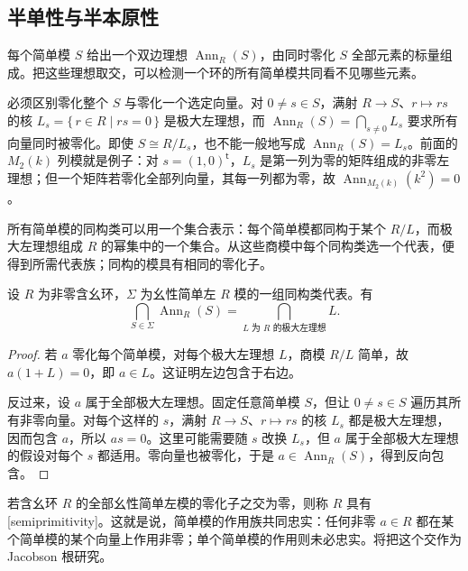 \subsection{半单性与半本原性}
\label{b2:subsec:1302:03}

每个简单模 \(S\) 给出一个双边理想 \(\operatorname{Ann}_R(S)\)，由同时零化 \(S\) 全部元素的标量组成。把这些理想取交，可以检测一个环的所有简单模共同看不见哪些元素。

\ProseParagraphBreak
必须区别零化整个 \(S\) 与零化一个选定向量。对 \(0\ne s\in S\)，满射 \(R\to S\)、\(r\mapsto rs\) 的核 \(L_s=\{\,r\in R\mid rs=0\,\}\) 是极大左理想，而 \(\operatorname{Ann}_R(S)=\bigcap_{s\ne0}L_s\) 要求所有向量同时被零化。即使 \(S\cong R/L_s\)，也不能一般地写成 \(\operatorname{Ann}_R(S)=L_s\)。前面的 \(M_2(k)\) 列模就是例子：对 \(s=(1,0)^{\mathsf t}\)，\(L_s\) 是第一列为零的矩阵组成的非零左理想；但一个矩阵若零化全部列向量，其每一列都为零，故 \(\operatorname{Ann}_{M_2(k)}(k^2)=0\)。

\ProseParagraphBreak
所有简单模的同构类可以用一个集合表示：每个简单模都同构于某个 \(R/L\)，而极大左理想组成 \(R\) 的幂集中的一个集合。从这些商模中每个同构类选一个代表，便得到所需代表族；同构的模具有相同的零化子。

\begin{proposition}\label{b2:prop:simple-annihilator-intersection}
	设 \(R\) 为非零含幺环，\(\Sigma\) 为幺性简单左 \(R\) 模的一组同构类代表。有
	\[
		\bigcap_{S\in\Sigma}\operatorname{Ann}_R(S) =\bigcap_{L\text{ 为 }R\text{ 的极大左理想}}L.
	\]
\end{proposition}
\begin{proof}
	若 \(a\) 零化每个简单模，对每个极大左理想 \(L\)，商模 \(R/L\) 简单，故 \(a(1+L)=0\)，即 \(a\in L\)。这证明左边包含于右边。

	反过来，设 \(a\) 属于全部极大左理想。固定任意简单模 \(S\)，但让 \(0\ne s\in S\) 遍历其所有非零向量。对每个这样的 \(s\)，满射 \(R\to S\)、\(r\mapsto rs\) 的核 \(L_s\) 都是极大左理想，因而包含 \(a\)，所以 \(as=0\)。这里可能需要随 \(s\) 改换 \(L_s\)，但 \(a\) 属于全部极大左理想的假设对每个 \(s\) 都适用。零向量也被零化，于是 \(a\in\operatorname{Ann}_R(S)\)，得到反向包含。
\end{proof}

若含幺环 \(R\) 的全部幺性简单左模的零化子之交为零，则称 \(R\) 具有[semiprimitivity]。这就是说，简单模的作用族共同忠实：任何非零 \(a\in R\) 都在某个简单模的某个向量上作用非零；单个简单模的作用则未必忠实。将把这个交作为 Jacobson 根研究。

